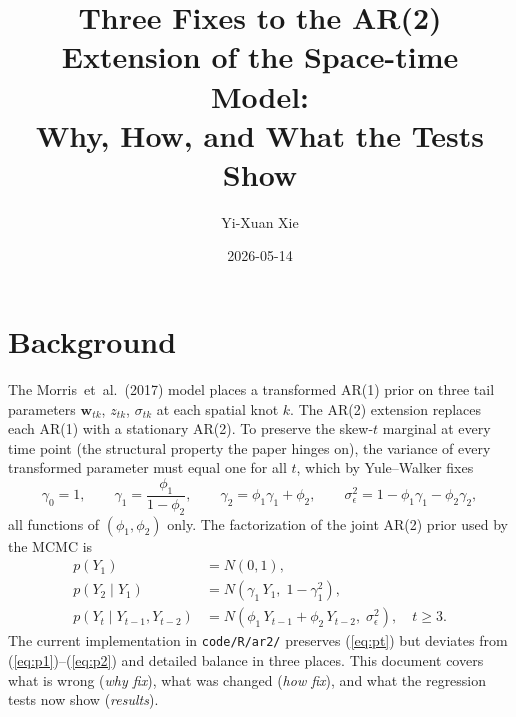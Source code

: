 \documentclass[11pt]{article}
\title{Three Fixes to the AR(2) Extension of the Space-time \Skewt Model:\\
       Why, How, and What the Tests Show}
\author{Yi-Xuan Xie}
\date{2026-05-14}
\newcommand{\bw}{\mathbf{w}}
\newcommand{\skewt}{skew-$t$\xspace}
\newcommand{\eref}[1]{(\ref{#1})}
\begin{document}
\maketitle

\section{Background}\label{ar2fix:bg}

The Morris~et~al.\ (2017) model places a transformed AR(1) prior on three tail
parameters $\bw_{tk}$, $z_{tk}$, $\sigma_{tk}$ at each spatial knot $k$. The
AR(2) extension replaces each AR(1) with a stationary AR(2). To preserve the
\skewt marginal at every time point (the structural property the paper hinges
on), the variance of every transformed parameter must equal one for all $t$,
which by Yule--Walker fixes
\begin{equation} \label{eq:moments}
  \gamma_0 = 1, \qquad
  \gamma_1 = \frac{\phi_1}{1 - \phi_2}, \qquad
  \gamma_2 = \phi_1\gamma_1 + \phi_2, \qquad
  \sigma_\epsilon^2 = 1 - \phi_1\gamma_1 - \phi_2\gamma_2,
\end{equation}
all functions of $(\phi_1, \phi_2)$ only. The factorization of the joint AR(2)
prior used by the MCMC is
\begin{align}
  p(Y_1) &= N(0, 1), \label{eq:p1} \\
  p(Y_2 \mid Y_1) &= N\!\left(\gamma_1\, Y_1,\; 1 - \gamma_1^2\right), \label{eq:p2} \\
  p(Y_t \mid Y_{t-1}, Y_{t-2}) &= N\!\left(\phi_1\, Y_{t-1} + \phi_2\, Y_{t-2},\; \sigma_\epsilon^2\right), \quad t \geq 3. \label{eq:pt}
\end{align}
The current implementation in \texttt{code/R/ar2/} preserves \eref{eq:pt} but
deviates from \eref{eq:p1}--\eref{eq:p2} and detailed balance in three places.
This document covers what is wrong (\textit{why fix}), what was changed
(\textit{how fix}), and what the regression tests now show (\textit{results}).
\end{document}
